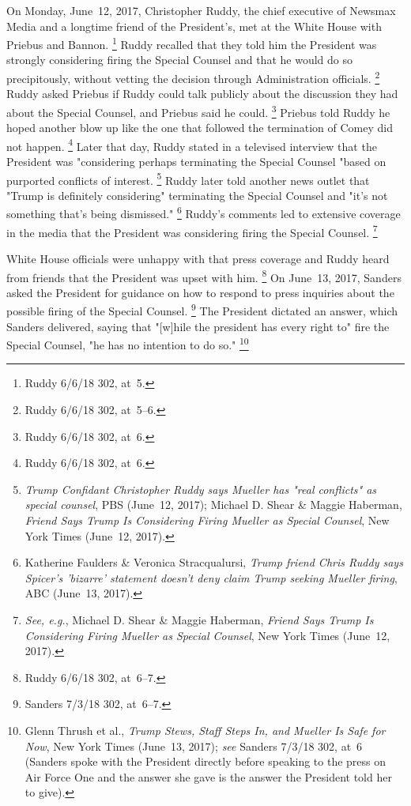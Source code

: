 On Monday, June~12, 2017, Christopher Ruddy, the chief executive of Newsmax Media and a longtime friend of the President's, met at the White House with Priebus and Bannon.%
\footnote{Ruddy 6/6/18 302, at~5.}
Ruddy recalled that they told him the President was strongly considering firing the Special Counsel and that he would do so precipitously, without vetting the decision through Administration officials.%
\footnote{Ruddy 6/6/18 302, at~5--6.}
Ruddy asked Priebus if Ruddy could talk publicly about the discussion they had about the Special Counsel, and Priebus said he could.%
\footnote{Ruddy 6/6/18 302, at~6.}
Priebus told Ruddy he hoped another blow up like the one that followed the termination of Comey did not happen.%
\footnote{Ruddy 6/6/18 302, at~6.}
Later that day, Ruddy stated in a televised interview that the President was "considering perhaps terminating the Special Counsel "based on purported conflicts of interest.%
\footnote{\textit{Trump Confidant Christopher Ruddy says Mueller has "real conflicts" as special counsel}, PBS (June~12, 2017);
Michael D. Shear \& Maggie Haberman, \textit{Friend Says Trump Is Considering Firing Mueller as Special Counsel}, New York Times (June~12, 2017).}
Ruddy later told another news outlet that "Trump is definitely considering" terminating the Special Counsel and "it's not something that's being dismissed."%
\footnote{Katherine Faulders \& Veronica Stracqualursi, \textit{Trump friend Chris Ruddy says Spicer's 'bizarre' statement doesn't deny claim Trump seeking Mueller firing}, ABC (June~13, 2017).}
Ruddy's comments led to extensive coverage in the media that the President was considering firing the Special Counsel.%
\footnote{\textit{See, e.g.}, Michael D. Shear \& Maggie Haberman, \textit{Friend Says Trump Is Considering Firing Mueller as Special Counsel}, New York Times (June~12, 2017).}

White House officials were unhappy with that press coverage and Ruddy heard from friends that the President was upset with him.%
\footnote{Ruddy 6/6/18 302, at~6--7.}
On June~13, 2017, Sanders asked the President for guidance on how to respond to press inquiries about the possible firing of the Special Counsel.%
\footnote{Sanders 7/3/18 302, at~6--7.}
The President dictated an answer, which Sanders delivered, saying that "[w]hile the president has every right to" fire the Special Counsel, "he has no intention to do so."%
\footnote{Glenn Thrush et al., \textit{Trump Stews, Staff Steps In, and Mueller Is Safe for Now}, New York Times (June~13, 2017);
\textit{see} Sanders 7/3/18 302, at~6 (Sanders spoke with the President directly before speaking to the press on Air Force One and the answer she gave is the answer the President told her to give).}

